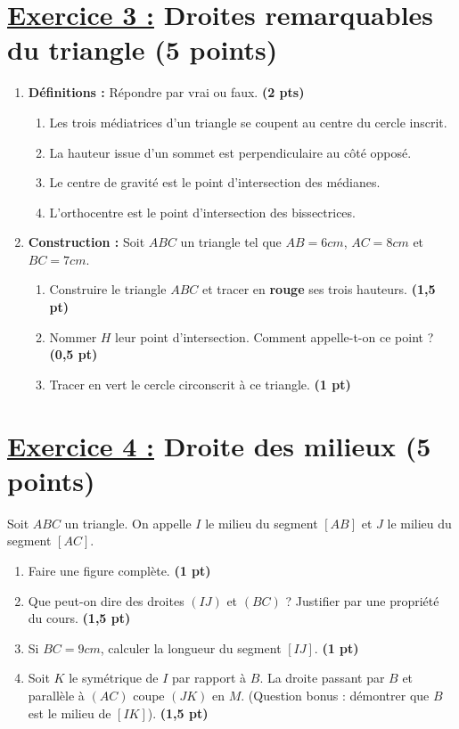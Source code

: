 \documentclass[12pt,a4paper]{article}
\begin{document}
\section*{\underline{Exercice 3 :} Droites remarquables du triangle (5 points)}
\begin{enumerate}
    \item \textbf{Définitions :} Répondre par vrai ou faux. \textbf{(2 pts)}
    \begin{enumerate}
        \item Les trois médiatrices d'un triangle se coupent au centre du cercle inscrit.
        \item La hauteur issue d'un sommet est perpendiculaire au côté opposé.
        \item Le centre de gravité est le point d'intersection des médianes.
        \item L'orthocentre est le point d'intersection des bissectrices.
    \end{enumerate}
    \item \textbf{Construction :} Soit $ABC$ un triangle tel que $AB=6cm$, $AC=8cm$ et $BC=7cm$.
    \begin{enumerate}
        \item Construire le triangle $ABC$ et tracer en \textbf{rouge} ses trois hauteurs. \textbf{(1,5 pt)}
        \item Nommer $H$ leur point d'intersection. Comment appelle-t-on ce point ? \textbf{(0,5 pt)}
        \item Tracer en vert le cercle circonscrit à ce triangle. \textbf{(1 pt)}
    \end{enumerate}
\end{enumerate}

\section*{\underline{Exercice 4 :} Droite des milieux (5 points)}
Soit $ABC$ un triangle. On appelle $I$ le milieu du segment $[AB]$ et $J$ le milieu du segment $[AC]$.
\begin{enumerate}
    \item Faire une figure complète. \textbf{(1 pt)}
    \item Que peut-on dire des droites $(IJ)$ et $(BC)$ ? Justifier par une propriété du cours. \textbf{(1,5 pt)}
    \item Si $BC = 9 cm$, calculer la longueur du segment $[IJ]$. \textbf{(1 pt)}
    \item Soit $K$ le symétrique de $I$ par rapport à $B$. La droite passant par $B$ et parallèle à $(AC)$ coupe $(JK)$ en $M$. (Question bonus : démontrer que $B$ est le milieu de $[IK]$). \textbf{(1,5 pt)}
\end{enumerate}
\end{document}
